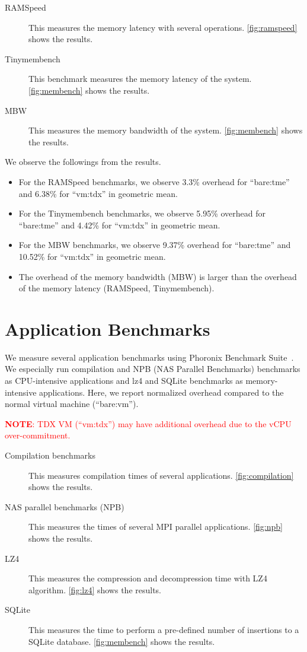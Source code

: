 \documentclass[letterpaper,twocolumn,10pt]{article}
\newcommand{\MP}[1]{\textcolor{red}{#1}}
\newcommand{\grumbler}[2]{\MP{{\bf #1}: #2}}
\newcommand{\note}[1]{\grumbler{NOTE}{#1}}
\begin{document}
\begin{description}
\item[RAMSpeed~\cite{ramspeed}] This measures the memory latency with several operations. \autoref{fig:ramspeed} shows the results.
\item[Tinymembench~\cite{tinymembench}] This benchmark measures the memory latency of the system. \autoref{fig:membench} shows the results.
\item[MBW~\cite{mbw}] This measures the memory bandwidth of the system. \autoref{fig:membench} shows the results.
\end{description}


We observe the followings from the results.
\begin{itemize}
    \item For the RAMSpeed benchmarks, we observe 3.3\% overhead for ``bare:tme'' and 6.38\% for ``vm:tdx'' in geometric mean.
    \item For the Tinymembench benchmarks, we observe 5.95\% overhead for ``bare:tme'' and 4.42\% for ``vm:tdx'' in geometric mean.
    \item For the MBW benchmarks, we observe 9.37\% overhead for ``bare:tme'' and 10.52\% for ``vm:tdx'' in geometric mean.
    \item The overhead of the memory bandwidth (MBW) is larger than the overhead of the memory latency (RAMSpeed, Tinymembench).
\end{itemize}

\section{Application Benchmarks}
\label{sec:app:benchmark}

We measure several application benchmarks using Phoronix Benchmark Suite~\cite{phoronix}.
We especially run compilation and NPB (NAS Parallel Benchmarks) benchmarks as CPU-intensive applications and lz4 and SQLite benchmarks as memory-intensive applications.
Here, we report normalized overhead compared to the normal virtual machine (``bare:vm'').

\note{TDX VM (``vm:tdx'') may have additional overhead due to the vCPU over-commitment.}

\begin{description}
\item[Compilation benchmarks~\cite{compilation}] This measures compilation times of several applications. \autoref{fig:compilation} shows the results.
\item[NAS parallel benchmarks (NPB)~\cite{npb}] This measures the times of several MPI parallel applications. \autoref{fig:npb} shows the results.
\item[LZ4~\cite{lz4}] This measures the compression and decompression time with LZ4 algorithm. \autoref{fig:lz4} shows the results.
\item[SQLite~\cite{sqlite_bench}] This measures the time to perform a pre-defined number of insertions to a SQLite database. \autoref{fig:membench} shows the results.
\end{description}
\end{document}
